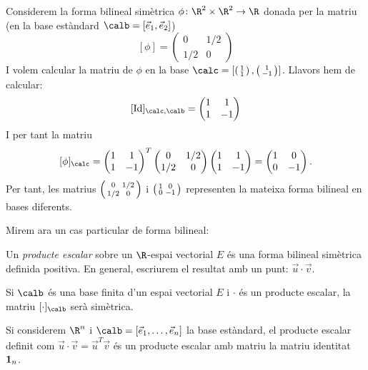 \begin{exemple}
Considerem la forma bilineal simètrica $\phi\colon \R^2 \times \R^2 \to \R$ donada per la matriu (en la base estàndard $\calb=[\vec e_1,\vec e_2]$)
\[
[\phi]=\begin{pmatrix} 0 & 1/2 \\ 1/2 & 0 \end{pmatrix}
\]
I volem calcular la matriu de $\phi$ en la base $\calc=[\smat{1\\1},\smat{1\\-1}]$. Llavors hem de calcular:
\[
[\Id]_{\calc,\calb}=\begin{pmatrix} 1 & 1 \\ 1 & -1 \end{pmatrix}
\]
I per tant la matriu
\[
[\phi]_\calc = \begin{pmatrix} 1 & 1 \\ 1 & -1 \end{pmatrix}^T
\begin{pmatrix} 0 & 1/2 \\ 1/2 & 0 \end{pmatrix}
\begin{pmatrix} 1 & 1 \\ 1 & -1 \end{pmatrix}=
\begin{pmatrix} 1 & 0 \\ 0 & -1 \end{pmatrix}.
\]
Per tant, les matrius $\left(\begin{smallmatrix}0 & 1/2 \\ 1/2 & 0\end{smallmatrix}\right)$ i $\left(\begin{smallmatrix}1 & 0 \\ 0 & -1\end{smallmatrix}\right)$ representen la mateixa forma bilineal en bases diferents.
\end{exemple}

Mirem ara un cas particular de forma bilineal:

\begin{definicio}
Un \emph{producte escalar} sobre un $\R$-espai vectorial $E$ és una forma bilineal simètrica definida positiva. En general, escriurem el resultat amb un punt: $\vec u \cdot \vec v$.
\end{definicio}
Si $\calb$ és una base finita d'un espai vectorial $E$ i $\cdot$ és un producte escalar, la matriu $[\cdot]_\calb$ serà simètrica.
\begin{exemple}
Si considerem $\R^n$ i $\calb=[\vec e_1, \dots, \vec e_n]$ la base estàndard, el producte escalar definit com $\vec u \cdot \vec v=\vec u^T \vec v$ és un producte escalar amb matriu la matriu identitat $\mathbf{1}_n$.
\end{exemple}

